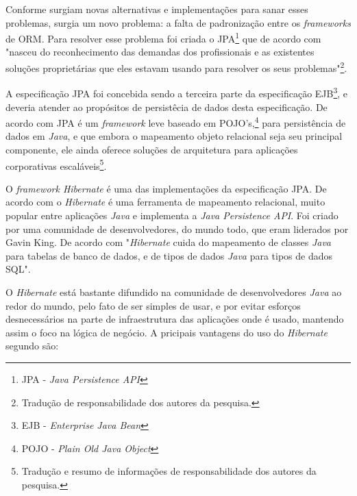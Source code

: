	\par Conforme surgiam novas alternativas e implementações para sanar esses
problemas, surgia um novo problema: a falta de padronização entre os
\textit{frameworks} de ORM. Para resolver esse problema foi criada o
JPA\footnote{JPA - \textit{Java Persistence API}} que de acordo com
 "nasceu do reconhecimento das demandas dos
profissionais e as existentes soluções proprietárias que eles estavam usando
para resolver os seus problemas"\footnote{Tradução de responsabilidade dos
autores da pesquisa.}. 
	
	\par A especificação JPA foi concebida sendo a terceira parte da
especificação EJB\footnote{EJB - \textit{Enterprise Java Bean}}, e deveria
atender ao propósitos de persistêcia de dados desta especificação.
De acordo com  JPA é um \textit{framework} leve
baseado em POJO's,\footnote{POJO - \textit{Plain Old Java Object }} para
persistência de dados em \textit{Java}, e que embora o mapeamento objeto
relacional seja seu principal componente, ele ainda oferece soluções de
arquitetura para aplicações corporativas escaláveis\footnote{Tradução e resumo
de informações de responsabilidade dos autores da pesquisa.}.

	\par O \textit{framework Hibernate} é uma das implementações da especificação
JPA. De acordo com  o \textit{Hibernate} é
uma ferramenta de mapeamento relacional, muito popular entre aplicações
\textit{Java} e implementa a \textit{Java Persistence API}. Foi criado por uma
comunidade de desenvolvedores, do mundo todo, que eram liderados por Gavin King.
De acordo com  "\textit{Hibernate} cuida do mapeamento
de classes \textit{Java} para tabelas de banco de dados, e de tipos de dados
\textit{Java} para tipos de dados SQL".

	\par O \textit{Hibernate} está bastante difundido na comunidade de
desenvolvedores \textit{Java} ao redor do mundo, pelo fato de ser simples de
usar, e por evitar esforços desnecessários na parte de infraestrutura das
aplicações onde é usado, mantendo assim o foco na lógica de negócio. A pricipais
vantagens do uso do \textit{Hibernate} segundo
 são:

